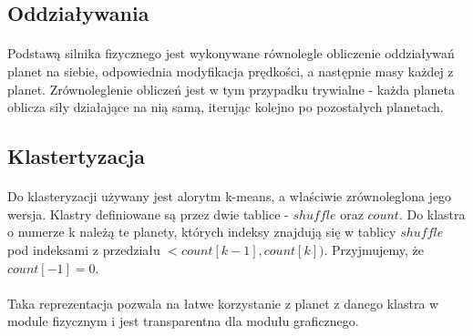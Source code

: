 \subsection{Oddziaływania}

\paragraph{}
Podstawą silnika fizycznego jest wykonywane równolegle obliczenie oddziaływań planet na siebie, odpowiednia modyfikacja prędkości, a następnie masy każdej z planet. Zrównoleglenie obliczeń jest w tym przypadku trywialne - każda planeta oblicza siły działające na nią samą, iterując kolejno po pozostałych planetach.

\subsection{Klastertyzacja}

\paragraph{} Do klasteryzacji używany jest alorytm k-means, a właściwie zrównoleglona jego wersja. Klastry definiowane są przez dwie tablice - \ensuremath{shuffle} oraz \ensuremath{count}. Do klastra o numerze k należą te planety, których indeksy znajdują się w tablicy \ensuremath{shuffle} pod indeksami z przedziału \ensuremath{< count[k-1], count[k] )}. Przyjmujemy, że \ensuremath{count[-1] = 0}.

\paragraph{} Taka reprezentacja pozwala na łatwe korzystanie z planet z danego klastra w module fizycznym i jest transparentna dla modułu graficznego.

